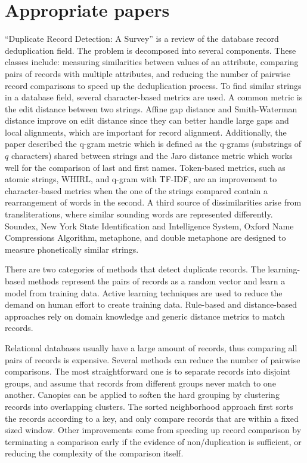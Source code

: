 \documentclass[]{article}
\begin{document}
\section{Appropriate papers} %
\label{sec:appropriate_papers}
``Duplicate Record Detection: A Survey'' \cite{Elmagarmid2007} is a review of the database record deduplication field.  The problem is decomposed into several components. These classes include: measuring similarities between values of an attribute, comparing pairs of records with multiple attributes, and reducing the number of pairwise record comparisons to speed up the deduplication process.  To find similar strings in a database field, several character-based metrics are used.  A common metric is the edit distance between two strings.  Affine gap distance and Smith-Waterman distance improve on edit distance since they can better handle large gaps and local alignments, which are important for record alignment.  Additionally, the paper described the q-gram metric which is defined as the q-grams (substrings of $q$ characters) shared between strings and the Jaro distance metric which works well for the comparison of last and first names.  Token-based metrics, such as atomic strings, WHIRL, and q-gram with TF-IDF, are an improvement to character-based metrics when the one of the strings compared contain a rearrangement of words in the second.  A third source of dissimilarities arise from transliterations, where similar sounding words are represented differently.  Soundex, New York State Identification and Intelligence System, Oxford Name Compressions Algorithm, metaphone, and double metaphone are designed to measure phonetically similar strings.  

There are two categories of methods that detect duplicate records.
The learning-based methods represent the pairs of records as a random vector and learn a model from training data.
Active learning techniques are used to reduce the demand on human effort to create training data.  Rule-based and distance-based approaches rely on domain knowledge and generic distance metrics to match records.

Relational databases usually have a large amount of records, thus comparing all pairs of records is expensive.  Several methods can reduce the number of pairwise comparisons.  The most straightforward one is to separate records into disjoint groups, and assume that records from different groups never match to one another.  Canopies can be applied to soften the hard grouping by clustering records into overlapping clusters.  The sorted neighborhood approach first sorts the records according to a key, and only compare records that are within a fixed sized window.  Other improvements come from speeding up record comparison by terminating a comparison early if the evidence of non/duplication is sufficient, or reducing the complexity of the comparison itself.
\end{document}
